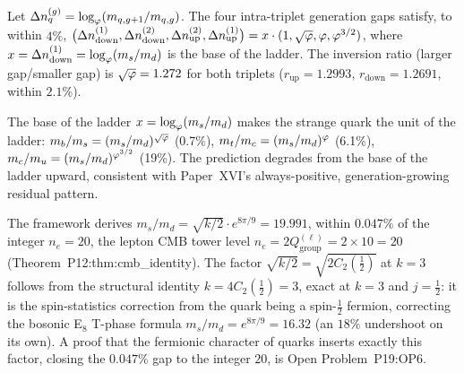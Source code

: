 \begin{theorem}
\label{P19:thm:sqrt_phi_ladder}
Let $\Delta n_q^{(g)}=\log_\varphi(m_{q,g+1}/m_{q,g})$. The four
intra-triplet generation gaps satisfy, to within $4\%$,
$\bigl(\Delta n_{\mathrm{down}}^{(1)},\Delta n_{\mathrm{down}}^{(2)},
\Delta n_{\mathrm{up}}^{(2)},\Delta n_{\mathrm{up}}^{(1)}\bigr)
=x\cdot(1,\sqrt{\varphi},\varphi,\varphi^{3/2})$, where
$x=\Delta n_{\mathrm{down}}^{(1)}=\log_\varphi(m_s/m_d)$ is the base of
the ladder. The inversion ratio (larger gap/smaller gap) is
$\sqrt{\varphi}=1.272$ for both triplets ($r_{\mathrm{up}}=1.2993$,
$r_{\mathrm{down}}=1.2691$, within $2.1\%$).
\end{theorem}

\begin{remark}
\label{P19:rem:strange_anchor}
The base of the ladder $x=\log_\varphi(m_s/m_d)$ makes the strange quark
the unit of the ladder: $m_b/m_s=(m_s/m_d)^{\sqrt{\varphi}}$ (0.7\%),
$m_t/m_c=(m_s/m_d)^{\varphi}$ (6.1\%), $m_c/m_u=(m_s/m_d)^{\varphi^{3/2}}$
(19\%). The prediction degrades from the base of the ladder upward,
consistent with Paper~XVI's always-positive, generation-growing
residual pattern.
\end{remark}

\begin{remark}[$m_s/m_d\approx n_e=20$: the spin-Casimir hypothesis]
\label{P19:rem:ms_md_integer}
The framework derives $m_s/m_d=\sqrt{k/2}\cdot e^{8\pi/9}=19.991$,
within $0.047\%$ of the integer $n_e=20$, the lepton CMB tower level
$n_e=2Q_{\mathrm{group}}^{(\ell)}=2\times10=20$
(Theorem~P12:thm:cmb\_identity). The factor $\sqrt{k/2}=
\sqrt{2C_2(\tfrac12)}$ at $k=3$ follows from the structural identity
$k=4C_2(\tfrac12)=3$, exact at $k=3$ and $j=\tfrac12$: it is the
spin-statistics correction from the quark being a spin-$\tfrac12$
fermion, correcting the bosonic E$_8$ T-phase formula
$m_s/m_d=e^{8\pi/9}=16.32$ (an $18\%$ undershoot on its own). A proof
that the fermionic character of quarks inserts exactly this factor,
closing the $0.047\%$ gap to the integer $20$, is Open
Problem~P19:OP6.
\end{remark}

